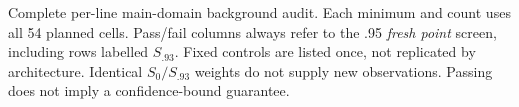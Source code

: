 \begin{table}[p]
\centering\scriptsize
\caption{Complete per-line main-domain background audit. Each minimum and count uses all 54 planned cells. Pass/fail columns always refer to the .95 \emph{fresh point} screen, including rows labelled $S_{.93}$. Fixed controls are listed once, not replicated by architecture. Identical $S_0/S_{.93}$ weights do not supply new observations. Passing does not imply a confidence-bound guarantee.}
\label{tab:background-audit}

\end{table}
